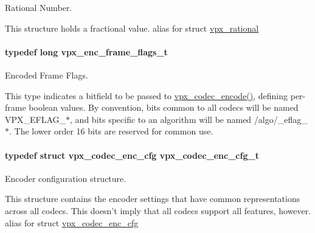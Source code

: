 \-Rational \-Number. 

\-This structure holds a fractional value. alias for struct \hyperlink{structvpx__rational}{vpx\-\_\-rational} \hypertarget{group__encoder_ga99e4a3c966f0de19fe1aa626bd860366}{
\paragraph[{vpx\-\_\-enc\-\_\-frame\-\_\-flags\-\_\-t}]{\setlength{\rightskip}{0pt plus 5cm}typedef long {\bf vpx\-\_\-enc\-\_\-frame\-\_\-flags\-\_\-t}}}
\label{group__encoder_ga99e4a3c966f0de19fe1aa626bd860366}


\-Encoded \-Frame \-Flags. 

\-This type indicates a bitfield to be passed to \hyperlink{group__encoder_gaf990542e2aeb389f05fae3e9c7803639}{vpx\-\_\-codec\-\_\-encode()}, defining per-\/frame boolean values. \-By convention, bits common to all codecs will be named \-V\-P\-X\-\_\-\-E\-F\-L\-A\-G\-\_\-$\ast$, and bits specific to an algorithm will be named /algo/\-\_\-eflag\-\_\-$\ast$. \-The lower order 16 bits are reserved for common use. \hypertarget{group__encoder_ga946236c809e493b31a815d82db1e59db}{
\paragraph[{vpx\-\_\-codec\-\_\-enc\-\_\-cfg\-\_\-t}]{\setlength{\rightskip}{0pt plus 5cm}typedef struct {\bf vpx\-\_\-codec\-\_\-enc\-\_\-cfg}  {\bf vpx\-\_\-codec\-\_\-enc\-\_\-cfg\-\_\-t}}}
\label{group__encoder_ga946236c809e493b31a815d82db1e59db}


\-Encoder configuration structure. 

\-This structure contains the encoder settings that have common representations across all codecs. \-This doesn't imply that all codecs support all features, however. alias for struct \hyperlink{structvpx__codec__enc__cfg}{vpx\-\_\-codec\-\_\-enc\-\_\-cfg} 

